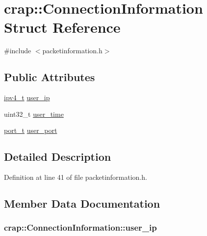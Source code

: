 \hypertarget{structcrap_1_1_connection_information}{}\section{crap\+:\+:Connection\+Information Struct Reference}
\label{structcrap_1_1_connection_information}


{\ttfamily \#include $<$packetinformation.\+h$>$}

\subsection*{Public Attributes}
\begin{DoxyCompactItemize}
\item 
\hyperlink{namespacecrap_a9ef32279067e77955c9f269926a331ee}{ipv4\+\_\+t} \hyperlink{structcrap_1_1_connection_information_ae7bae78f65e73afb728128b18325e3e8}{user\+\_\+ip}
\item 
uint32\+\_\+t \hyperlink{structcrap_1_1_connection_information_af361c0986431eeec02ea4149de72496c}{user\+\_\+time}
\item 
\hyperlink{namespacecrap_a21d8c14ae6ca715c519ff369042149dd}{port\+\_\+t} \hyperlink{structcrap_1_1_connection_information_a48470bcb4879d69d481d3c7f00e66daa}{user\+\_\+port}
\end{DoxyCompactItemize}


\subsection{Detailed Description}


Definition at line 41 of file packetinformation.\+h.



\subsection{Member Data Documentation}
\hypertarget{structcrap_1_1_connection_information_ae7bae78f65e73afb728128b18325e3e8}{}
\subsubsection[{user\+\_\+ip}]{ crap\+::\+Connection\+Information\+::user\+\_\+ip}\label{structcrap_1_1_connection_information_ae7bae78f65e73afb728128b18325e3e8}


